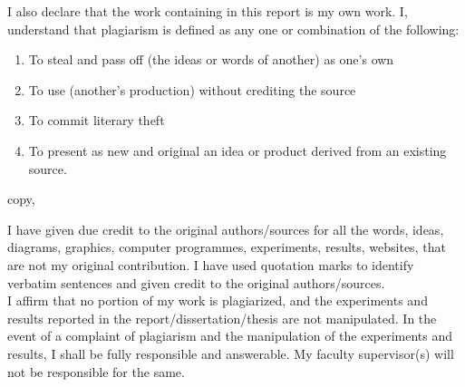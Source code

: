 \documentclass[12pt,a4paper]{article}
\begin{document}
\noindent I also declare that the work containing in this report is my own work. I, understand that plagiarism is defined as any one or combination of the following:
\begin{enumerate}
\item To steal and pass off (the ideas or words of another) as one's own
\item To use (another's production) without crediting the source
\item To commit literary theft
\item To present as new and original an idea or product derived from an existing source.
\end{enumerate}
copy,

\noindent I have given due credit to the original authors/sources for all the words, ideas, diagrams, graphics, computer programmes, experiments, results, websites, that are not my original contribution. I have used quotation marks to identify verbatim sentences and given credit to the original authors/sources.\\

\noindent I affirm that no portion of my work is plagiarized, and the experiments and results reported in the report/dissertation/thesis are not manipulated. In the event of a complaint of plagiarism and the manipulation of the experiments and results, I shall be fully responsible and answerable. My faculty supervisor(s) will not be responsible for the same.\vspace{1cm}\\
\end{document}
